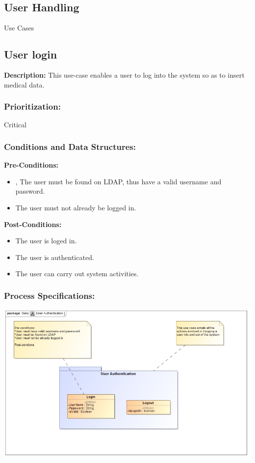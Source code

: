 
\newpage
\setlength{\voffset}{-3cm}

\begin{center}
\section{\textbf{\huge{User Handling}}}

\Large{Use Cases}
\end{center}


\subsection{User login}
\textbf{Description:}
This use-case enables a user to log into the system so as to insert medical data.
\subsubsection{Prioritization:}
Critical
\subsubsection{Conditions and Data Structures:}
\textbf{Pre-Conditions:}
\begin{itemize}
	\item , The user must be found on LDAP, thus have a valid username and password.
	\item The user must not already be logged in.
\end{itemize}

\textbf{Post-Conditions:}	
\begin{itemize}
	\item The user is loged in.
	\item The user is authenticated.
	\item The user can carry out system activities.
\end{itemize}
\subsubsection{Process Specifications:} 
\includegraphics[width=1\linewidth]{./Graphics/Login}



